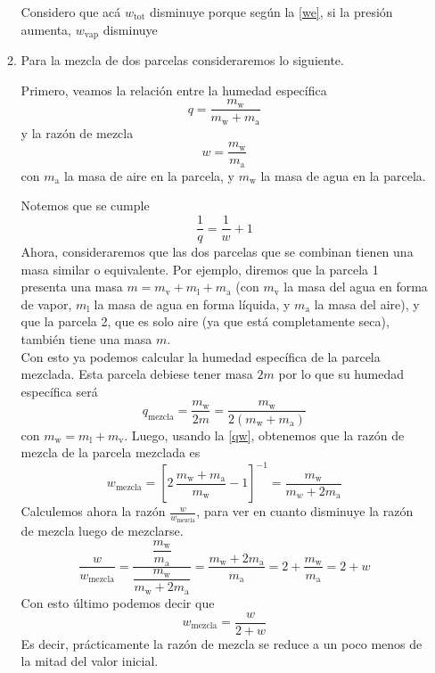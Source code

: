 \documentclass[../main.tex]{subfiles}
\begin{document}
\begin{enumerate}[a)]
\begin{enumerate}
    Considero que acá $w_\text{tot}$ disminuye porque según la \autoref{we}, si la presión aumenta, $w_\text{vap}$ disminuye
    \newpage
    \item Para la mezcla de dos parcelas consideraremos lo siguiente.

        Primero, veamos la relación entre la humedad específica
        $$q = \frac{m_\text{w}}{m_\text{w} + m_\text{a} }$$
       y la razón de mezcla
    $$w = \frac{m_\text{w}}{m_\text{a}}  $$
    con $m_\text{a}$ la masa de aire en la parcela, y $m_\text{w}$ la masa de agua en la parcela.

    Notemos que se cumple 
    \begin{equation}
        \frac{1}{q} = \frac{1}{w} + 1 \label{qw}
    \end{equation}
    Ahora, consideraremos que las dos parcelas que se combinan tienen una masa similar o equivalente. 
    Por ejemplo, diremos que la parcela 1 presenta una masa $m = m_\text{v}+ m_\text{l} + m_\text{a}$ (con $m_\text{v}$ la masa del agua en forma de vapor, $m_\text{l}$ la masa de agua en forma líquida, y $m_\text{a}$ la masa del aire), y que la parcela 2, que es solo aire (ya que está completamente seca), también tiene una masa $m$.\\

    Con esto ya podemos calcular la humedad específica de la parcela mezclada. Esta parcela debiese tener masa $2m$ por lo que su humedad específica será
    \begin{equation}
        q_\text{mezcla} = \frac{m_\text{w}}{2m} = \frac{m_\text{w}}{2(m_\text{w} + m_\text{a})}
    \end{equation}
con $m_\text{w} = m_\text{l} + m_\text{v}$. Luego, usando la \autoref{qw}, obtenemos que la razón de mezcla de la parcela mezclada es 
\begin{equation}
    w_\text{mezcla} = \left[2\, \frac{m_\text{w} + m_\text{a}}{m_\text{w}} -1 \right]^{-1} = \frac{m_\text{w}}{m_w + 2m_\text{a}}
\end{equation}
Calculemos ahora la razón $\frac{w}{w_\text{mezcla}}$, para ver en cuanto disminuye la razón de mezcla luego de mezclarse.
\begin{equation}
    \frac{w}{w_\text{mezcla}} = \frac{\dfrac{m_\text{w}}{m_\text{a}}}{\dfrac{m_\text{w}}{m_\text{w}+2m_\text{a}}} = \frac{m_\text{w} + 2m_\text{a}}{m_\text{a}} = 2 + \frac{m_\text{w}}{m_\text{a}}= 2+ w
\end{equation}
Con esto último podemos decir que 
\begin{equation}
    w_\text{mezcla} = \frac{w}{2+w}
\end{equation}
Es decir, prácticamente la razón de mezcla se reduce a un poco menos de la mitad del valor inicial.\\


\end{enumerate}
\end{enumerate}
\end{document}

